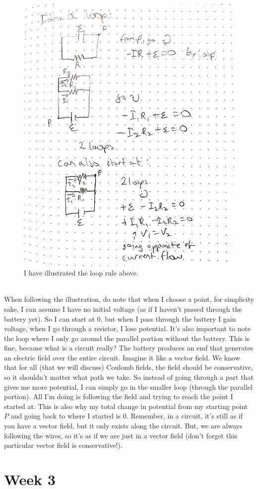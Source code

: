 \documentclass{article}
\begin{document}
\pagebreak
\begin{figure}[ht]
\center
\includegraphics[width=.3\textwidth]{images/Week2pic5.jpg}
\caption{I have illustrated the loop rule above.}
\end{figure}
\\
When following the illustration, do note that when I choose a point, for simplicity sake, I can assume I have no initial voltage (as if I haven't passed through the battery yet). So I can start at $0$, but when I pass through the battery I gain voltage, when I go through a resistor, I lose potential. It's also important to note the loop where I only go around the parallel portion without the battery. This is fine, because what is a circuit really? The battery produces an emf that generates an electric field over the entire circuit. Imagine it like a vector field. We know that for all (that we will discuss) Coulomb fields, the field should be conservative, so it shouldn't matter what path we take. So instead of going through a part that gives me more potential, I can simply go in the smaller loop (through the parallel portion). All I'm doing is following the field and trying to reach the point I started at. This is also why my total change in potential from my starting point $P$ and going back to where I started is $0$. Remember, in a circuit, it's still as if you have a vector field, but it only exists along the circuit. But, we are always following the wires, so it's as if we are just in a vector field (don't forget this particular vector field is conservative!).  

\pagebreak

\section{Week 3}

\pagebreak
\end{document}
